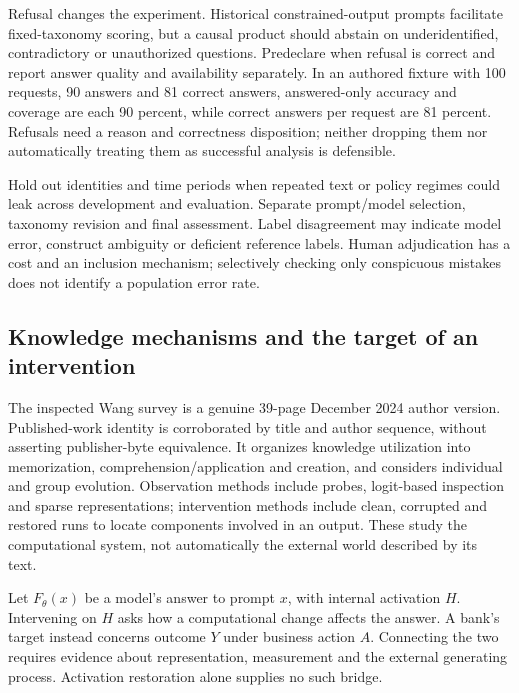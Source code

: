 Refusal changes the experiment. Historical constrained-output prompts facilitate fixed-taxonomy scoring, but a causal product should abstain on underidentified, contradictory or unauthorized questions. Predeclare when refusal is correct and report answer quality and availability separately. In an authored fixture with 100 requests, 90 answers and 81 correct answers, answered-only accuracy and coverage are each 90 percent, while correct answers per request are 81 percent. Refusals need a reason and correctness disposition; neither dropping them nor automatically treating them as successful analysis is defensible.~\citep{exec24_css_original,exec24_css_knowledge_reference}

Hold out identities and time periods when repeated text or policy regimes could leak across development and evaluation. Separate prompt/model selection, taxonomy revision and final assessment. Label disagreement may indicate model error, construct ambiguity or deficient reference labels. Human adjudication has a cost and an inclusion mechanism; selectively checking only conspicuous mistakes does not identify a population error rate.~\citep{exec24_css_knowledge_reference}

\subsection{Knowledge mechanisms and the target of an intervention}
The inspected Wang survey is a genuine 39-page December 2024 author version. Published-work identity is corroborated by title and author sequence, without asserting publisher-byte equivalence. It organizes knowledge utilization into memorization, comprehension/application and creation, and considers individual and group evolution. Observation methods include probes, logit-based inspection and sparse representations; intervention methods include clean, corrupted and restored runs to locate components involved in an output. These study the computational system, not automatically the external world described by its text.~\citep{exec24_knowledge_original}

Let $F_\theta(x)$ be a model's answer to prompt $x$, with internal activation $H$. Intervening on $H$ asks how a computational change affects the answer. A bank's target instead concerns outcome $Y$ under business action $A$. Connecting the two requires evidence about representation, measurement and the external generating process. Activation restoration alone supplies no such bridge.~\citep{exec24_css_knowledge_reference}

